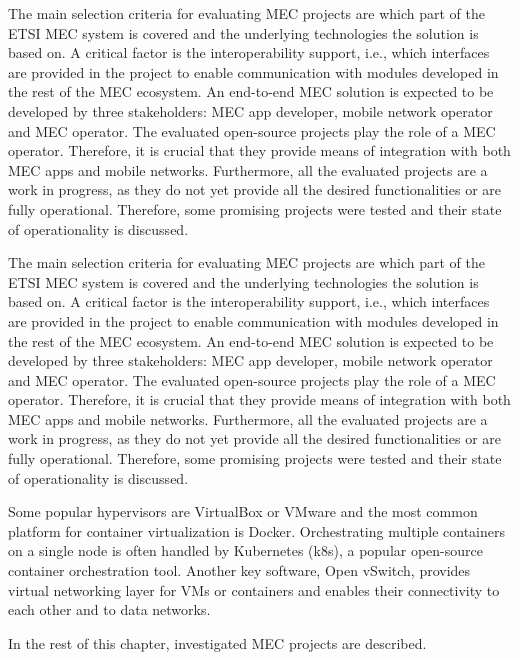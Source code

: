\documentclass[12pt,a4paper,twoside]{report}
\begin{document}
The main selection criteria for evaluating MEC projects are which part of the ETSI MEC system is covered and the underlying technologies the solution is based on. A critical factor is the interoperability support, i.e., which interfaces are provided in the project to enable communication with modules developed in the rest of the MEC ecosystem. An end-to-end MEC solution is expected to be developed by three stakeholders: MEC app developer, mobile network operator and MEC operator. The evaluated open-source projects play the role of a MEC operator. Therefore, it is crucial that they provide means of integration with both MEC apps and mobile networks. Furthermore, all the evaluated projects are a work in progress, as they do not yet provide all the desired functionalities or are fully operational. Therefore, some promising projects were tested and their state of operationality is discussed.

The main selection criteria for evaluating MEC projects are which part of the ETSI MEC system is covered and the underlying technologies the solution is based on. A critical factor is the interoperability support, i.e., which interfaces are provided in the project to enable communication with modules developed in the rest of the MEC ecosystem. An end-to-end MEC solution is expected to be developed by three stakeholders: MEC app developer, mobile network operator and MEC operator. The evaluated open-source projects play the role of a MEC operator. Therefore, it is crucial that they provide means of integration with both MEC apps and mobile networks. Furthermore, all the evaluated projects are a work in progress, as they do not yet provide all the desired functionalities or are fully operational. Therefore, some promising projects were tested and their state of operationality is discussed.

Some popular hypervisors are VirtualBox or VMware and the most common platform for container virtualization is Docker. Orchestrating multiple containers on a single node is often handled by Kubernetes (k8s), a popular open-source container orchestration tool. Another key software, Open vSwitch, provides virtual networking layer for VMs or containers and enables their connectivity to each other and to data networks. 

In the rest of this chapter, investigated MEC projects are described.
\end{document}
